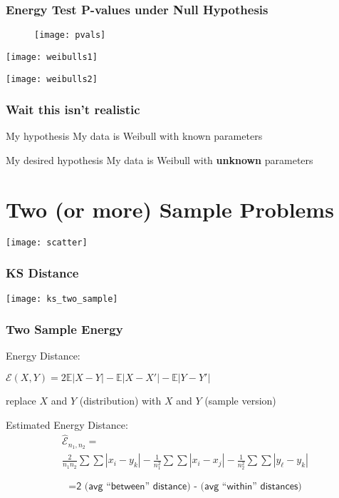 \documentclass[presentation]{beamer}
\begin{document}
\begin{frame}
  \frametitle{Energy Test P-values under Null Hypothesis}
  \begin{figure}
    \centering
    \texttt{[image: pvals]}
  \end{figure}
\end{frame}


\begin{frame}
  \texttt{[image: weibulls1]} 
\end{frame}


\begin{frame}
  \texttt{[image: weibulls2]} 
\end{frame}

\begin{frame}
  \frametitle{Wait this isn't realistic}
  \begin{block}{My hypothesis}
    My data is Weibull with known parameters
  \end{block}
  \vskip 0.5in
  \begin{block}{My desired hypothesis}
    My data is Weibull with \textbf{unknown} parameters
  \end{block}
\end{frame}

\section{Two (or more) Sample Problems}

\begin{frame}
  \texttt{[image: scatter]}
\end{frame}

\begin{frame}
  \frametitle{KS Distance}
  \texttt{[image: ks\_two\_sample]}
\end{frame}

\begin{frame}
  \frametitle{Two Sample Energy}
  \begin{block}{Energy Distance:}
    \begin{center}
      $\mathcal{E}(X,Y) = 2\mathbb{E}|X - Y| - \mathbb{E}|X - X'| -
      \mathbb{E}|Y - Y'|$
    \end{center}
  \end{block}
  replace $X$ and $Y$ (distribution) with $X$ and $Y$ (sample version)
  \begin{block}{Estimated Energy Distance:}
    \begin{gather*}
      \hat{\mathcal{E}}_{n_1, n_2} = \\ \frac{2}{n_1 n_2} \sum \sum |x_i - y_k| -
      \frac{1}{n_1^2} \sum \sum |x_i - x_j| - \frac{1}{n_2^2} \sum \sum |y_\ell - y_k| 
    \end{gather*}
    
    \begin{displaymath}
      = \textsf{2 (avg ``between'' distance) - (avg ``within'' distances)}
    \end{displaymath}
  \end{block}
\end{frame}
\end{document}
